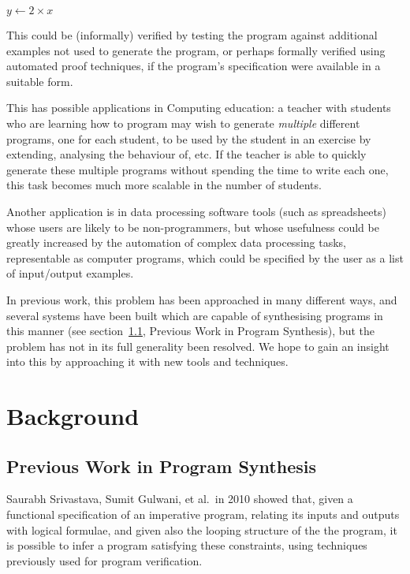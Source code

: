 \documentclass[a4paper,twoside,notitlepage]{article}
\begin{document}
\begin{algorithmic}[H]
\State $y \gets 2 \times x$
\end{algorithmic}

This could be (informally) verified by testing the program against additional 
examples not used to generate the program, or perhaps formally verified using 
automated proof techniques, if the program's specification were available in a 
suitable form.

This has possible applications in Computing education: a teacher with students who are 
learning how to program may wish to generate \emph{multiple} different programs, one 
for each student, to be used by the student in an exercise by extending, analysing the 
behaviour of, etc. If the teacher is able to quickly generate these multiple programs 
without spending the time to write each one, this task becomes much more scalable in 
the number of students.

Another application is in data processing software tools (such as spreadsheets) whose 
users are likely to be non-programmers, but whose usefulness could be greatly increased 
by the automation of complex data processing tasks, representable as computer programs, 
which could be specified by the user as a list of input/output examples.

In previous work, this problem has been approached in many different ways, and 
several systems have been built which are capable of synthesising programs in 
this manner (see section~\ref{sec:prvsyn}, Previous Work in Program 
Synthesis), but the problem has not in its full generality been resolved. We 
hope to gain an insight into this by approaching it with new tools and 
techniques.

\section{Background}

\subsection{Previous Work in Program Synthesis} \label{sec:prvsyn}

Saurabh Srivastava, Sumit Gulwani, et al.\ in 2010 showed\cite{popl10syn} 
that, given a functional specification of an imperative program, relating its 
inputs and outputs with logical formulae, and given also the looping structure 
of the the program, it is possible to infer a program satisfying these 
constraints, using techniques previously used for program verification.
\end{document}
